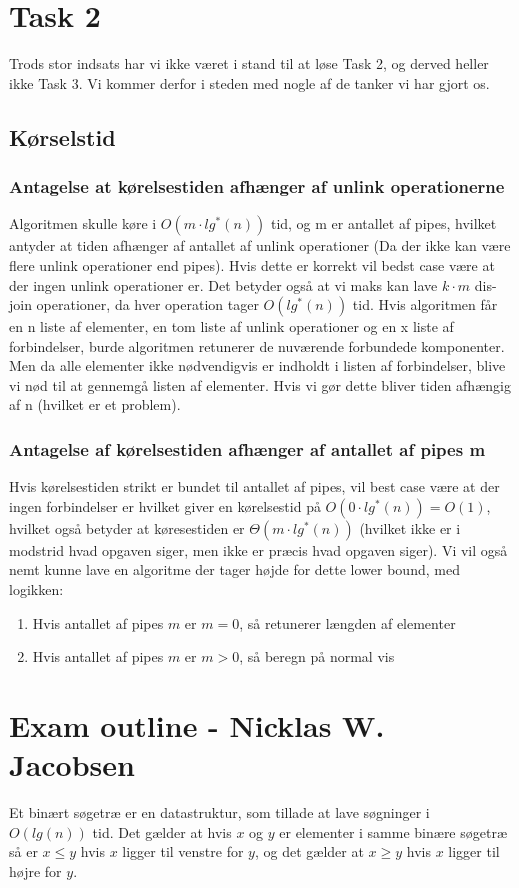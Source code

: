 \documentclass[12pt]{article}
\begin{document}
\section*{Task 2}
Trods stor indsats har vi ikke været i stand til at løse Task 2, og derved heller ikke Task 3. Vi kommer derfor i steden med nogle af de tanker vi har gjort os.
\subsection*{Kørselstid}
\subsubsection*{Antagelse at kørelsestiden afhænger af unlink operationerne}
Algoritmen skulle køre i $O(m\cdot lg^*(n))$ tid, og m er antallet af pipes, hvilket antyder at tiden afhænger af antallet af unlink operationer (Da der ikke kan være flere unlink operationer end pipes). Hvis dette er korrekt vil bedst case være at der ingen unlink operationer er. Det betyder også at vi maks kan lave $k\cdot m$ dis-join operationer, da hver operation tager $O(lg^*(n))$ tid.
Hvis algoritmen får en n liste af elementer, en tom liste af unlink operationer og en x liste af forbindelser, burde algoritmen retunerer de nuværende forbundede komponenter. Men da alle elementer ikke nødvendigvis er indholdt i listen af forbindelser, blive vi nød til at gennemgå listen af elementer. Hvis vi gør dette bliver tiden afhængig af n (hvilket er et problem).
\subsubsection*{Antagelse af kørelsestiden afhænger af antallet af pipes m}
Hvis kørelsestiden strikt er bundet til antallet af pipes, vil best case være at der ingen forbindelser er hvilket giver en kørelsestid på $O(0\cdot lg^*(n))=O(1)$, hvilket også betyder at køresestiden er $\Theta(m\cdot lg^*(n))$ (hvilket ikke er i modstrid hvad opgaven siger, men ikke er præcis hvad opgaven siger). Vi vil også nemt kunne lave en algoritme der tager højde for dette lower bound, med logikken:\\
\begin{enumerate}
  \item{Hvis antallet af pipes $m$ er $m=0$, så retunerer længden af elementer}
  \item{Hvis antallet af pipes $m$ er $m > 0$, så beregn på normal vis}
\end{enumerate}
\newpage
\section*{Exam outline - Nicklas W. Jacobsen}
Et binært søgetræ er en datastruktur, som tillade at lave søgninger i $O(lg(n))$ tid.
Det gælder at hvis $x$ og $y$ er elementer i samme binære søgetræ så er $x \leq y$ hvis $x$ ligger til venstre for $y$, og det gælder at  $x \geq y$ hvis $x$ ligger til højre for $y$.
\end{document}
